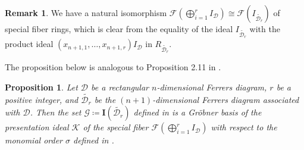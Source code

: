 \documentclass[11pt,a4paper,reqno,dvipsnames]{amsart}
\theoremstyle{plain}
\newtheorem{Proposition}[Theorem]{Proposition}
\theoremstyle{definition}
\newtheorem{Assumptions and Discussion}[Theorem]{Assumptions and Discussion}
\newtheorem{Remark}[Theorem]{Remark}
\theoremstyle{remark}
\newcommand\bfI{\mathbf{I}}
\newcommand\calD{\mathcal{D}}
\newcommand\calF{\mathcal{F}}
\newcommand\calG{\mathcal{G}}
\newcommand\calK{\mathcal{K}}
\begin{document}
\begin{Remark}
    \label{extendtoN+1}
    We have a natural isomorphism $\calF(\bigoplus_{i=1}^{r}I_{ \calD}) \cong \calF(I_{ \widetilde{\calD_r}})$ of special fiber rings, which is clear from the
    equality of the ideal $I_{ \widetilde{\calD_r}}$ with the product ideal $(x_{n+1,1},\dots,x_{n+1,r})I_{\calD}$ in $R_{\widetilde{\calD_r}}$.
\end{Remark}


The proposition below is analogous to Proposition 2.11 in \cite{DeNegri}.

\begin{Proposition}
    \label{FiberofOneGen}
    Let $\calD$ be a rectangular $n$-dimensional Ferrers diagram,  $r$ be a positive integer, and $\widetilde{\calD_r}$ be the $(n+1)$-dimensional Ferrers diagram associated with $\calD$. Then the set $\calG\coloneqq \bfI(\widetilde{\calD_r})$ defined in  is a Gr\"{o}bner basis of the presentation ideal $\calK$ of the special fiber $\calF(\bigoplus_{i=1}^{r}I_{\calD})$ with respect to the monomial order $\sigma$ defined in .
\end{Proposition}
\end{document}
